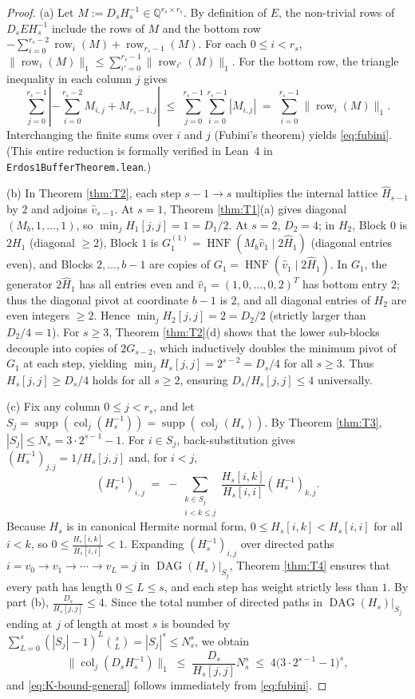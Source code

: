 \documentclass[11pt,a4paper]{article}
\theoremstyle{plain}
\theoremstyle{definition}
\newcommand{\Q}{\mathbb{Q}}
\newcommand{\HNF}{\operatorname{HNF}}
\newcommand{\supp}{\operatorname{supp}}
\newcommand{\DAG}{\operatorname{DAG}}
\newcommand{\row}{\operatorname{row}}
\newcommand{\col}{\operatorname{col}}
\begin{document}
\begin{proof}
(a) Let $M := D_s H_s^{-1} \in \Q^{r_s \times r_s}$. By definition of $E$, the non-trivial rows of $D_s E H_s^{-1}$ include the rows of $M$ and the bottom row $-\sum_{i=0}^{r_s-2} \row_i(M) + \row_{r_s-1}(M)$. For each $0 \le i < r_s$, $\|\row_i(M)\|_1 \le \sum_{i'=0}^{r_s-1} \|\row_{i'}(M)\|_1$. For the bottom row, the triangle inequality in each column $j$ gives
\[
\sum_{j=0}^{r_s-1} \left|-\sum_{i=0}^{r_s-2} M_{i,j} + M_{r_s-1,j}\right| \;\le\; \sum_{j=0}^{r_s-1} \sum_{i=0}^{r_s-1} |M_{i,j}| \;=\; \sum_{i=0}^{r_s-1} \|\row_i(M)\|_1.
\]
Interchanging the finite sums over $i$ and $j$ (Fubini's theorem) yields \eqref{eq:fubini}. (This entire reduction is formally verified in Lean~4 in \texttt{Erdos1BufferTheorem.lean}.)

(b) In Theorem \ref{thm:T2}, each step $s-1 \to s$ multiplies the internal lattice $\hat{H}_{s-1}$ by $2$ and adjoins $\hat{v}_{s-1}$. At $s = 1$, Theorem \ref{thm:T1}(a) gives diagonal $(M_b, 1, \dots, 1)$, so $\min_j H_1[j,j] = 1 = D_1 / 2$. At $s = 2$, $D_2 = 4$; in $H_2$, Block $0$ is $2 H_1$ (diagonal $\ge 2$), Block $1$ is $G_1^{(1)} = \HNF(M_b \hat{v}_1 \mid 2\hat{H}_1)$ (diagonal entries even), and Blocks $2,\dots,b-1$ are copies of $G_1 = \HNF(\hat{v}_1 \mid 2\hat{H}_1)$. In $G_1$, the generator $2\hat{H}_1$ has all entries even and $\hat{v}_1 = (1, 0, \dots, 0, 2)^T$ has bottom entry $2$; thus the diagonal pivot at coordinate $b-1$ is $2$, and all diagonal entries of $H_2$ are even integers $\ge 2$. Hence $\min_j H_2[j,j] = 2 = D_2 / 2$ (strictly larger than $D_2 / 4 = 1$). For $s \ge 3$, Theorem \ref{thm:T2}(d) shows that the lower sub-blocks decouple into copies of $2 G_{s-2}$, which inductively doubles the minimum pivot of $G_1$ at each step, yielding $\min_j H_s[j,j] = 2^{s-2} = D_s / 4$ for all $s \ge 3$. Thus $H_s[j,j] \ge D_s / 4$ holds for all $s \ge 2$, ensuring $D_s / H_s[j,j] \le 4$ universally.

(c) Fix any column $0 \le j < r_s$, and let $S_j = \supp(\col_j(H_s^{-1})) = \supp(\col_j(H_s))$. By Theorem \ref{thm:T3}, $|S_j| \le N_s = 3 \cdot 2^{s-1} - 1$. For $i \in S_j$, back-substitution gives $(H_s^{-1})_{j,j} = 1/H_s[j,j]$ and, for $i < j$,
\[
(H_s^{-1})_{i,j} \;=\; -\sum_{\substack{k \in S_j \\ i < k \le j}} \frac{H_s[i,k]}{H_s[i,i]} (H_s^{-1})_{k,j}.
\]
Because $H_s$ is in canonical Hermite normal form, $0 \le H_s[i,k] < H_s[i,i]$ for all $i < k$, so $0 \le \frac{H_s[i,k]}{H_s[i,i]} < 1$. Expanding $(H_s^{-1})_{i,j}$ over directed paths $i = v_0 \to v_1 \to \cdots \to v_L = j$ in $\DAG(H_s)|_{S_j}$, Theorem \ref{thm:T4} ensures that every path has length $0 \le L \le s$, and each step has weight strictly less than $1$. By part (b), $\frac{D_s}{H_s[j,j]} \le 4$. Since the total number of directed paths in $\DAG(H_s)|_{S_j}$ ending at $j$ of length at most $s$ is bounded by $\sum_{L=0}^s (|S_j|-1)^L \binom{s}{L} = |S_j|^s \le N_s^s$, we obtain
\[
\|\col_j(D_s H_s^{-1})\|_1 \;\le\; \frac{D_s}{H_s[j,j]} N_s^s \;\le\; 4\big(3 \cdot 2^{s-1} - 1\big)^s,
\]
and \eqref{eq:K-bound-general} follows immediately from \eqref{eq:fubini}.
\end{proof}
\end{document}
